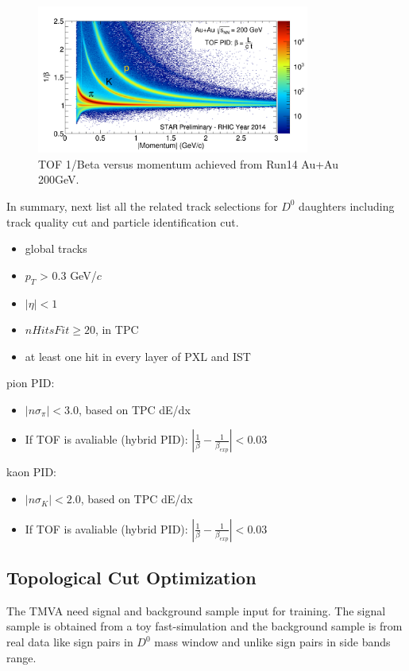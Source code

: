 \documentclass[a4paper]{article}
\begin{document}
\begin{figure}[htbp]
\centering
\includegraphics[keepaspectratio,width=0.8\textwidth]{fig/Run14_AuAu_tofBeta_PR.png}
\caption{TOF 1/Beta versus momentum achieved from Run14 Au+Au 200GeV.}
 \label{fig:tofPID}
\end{figure}

In summary, next list all the related track selections for $D^0$ daughters including track quality cut and particle identification cut.
\begin{itemize}
\item global tracks
\item $p_{T}$ > 0.3 GeV/$c$
\item $|\eta| < 1$
\item $nHitsFit \ge 20$, in TPC
\item at least one hit in every layer of PXL and IST
\end{itemize}

pion PID:
\begin{itemize}
  \item $|n\sigma_{\pi}| < 3.0 $, based on TPC dE/dx
  \item If TOF is avaliable (hybrid PID):  $|\frac{1}{\beta}-\frac{1}{\beta_{exp}}|<0.03$
\end{itemize}

kaon PID:
\begin{itemize}
  \item $|n\sigma_{K}| < 2.0 $, based on TPC dE/dx
  \item If TOF is avaliable (hybrid PID):  $|\frac{1}{\beta}-\frac{1}{\beta_{exp}}|<0.03$
\end{itemize}


\subsection{Topological Cut Optimization}

The TMVA need signal and background sample input for training. The signal sample is obtained from a toy fast-simulation and the background sample is from real data like sign pairs in $D^0$ mass window and unlike sign pairs in side bands range. 
\end{document}
